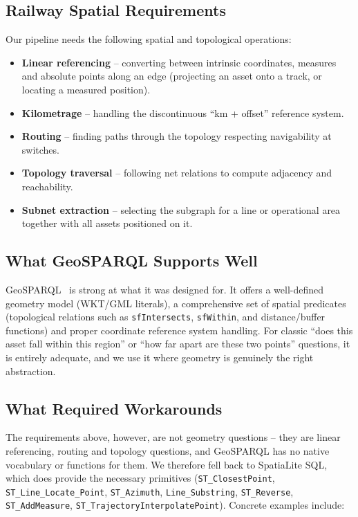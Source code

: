 \documentclass[twocolumn]{ceurart}
\begin{document}
\subsection{Railway Spatial Requirements}

Our pipeline needs the following spatial and topological operations:

\begin{itemize}
  \item \textbf{Linear referencing} -- converting between intrinsic coordinates,
        measures and absolute points along an edge (projecting an asset onto a
        track, or locating a measured position).
  \item \textbf{Kilometrage} -- handling the discontinuous ``km + offset''
        reference system.
  \item \textbf{Routing} -- finding paths through the topology respecting
        navigability at switches.
  \item \textbf{Topology traversal} -- following net relations to compute
        adjacency and reachability.
  \item \textbf{Subnet extraction} -- selecting the subgraph for a line or
        operational area together with all assets positioned on it.
\end{itemize}

\subsection{What GeoSPARQL Supports Well}

GeoSPARQL~\cite{geosparql} is strong at what it was designed for. It offers a
well-defined geometry model (WKT/GML literals), a comprehensive set of spatial
predicates (topological relations such as \texttt{sfIntersects},
\texttt{sfWithin}, and distance/buffer functions) and proper coordinate
reference system handling. For classic ``does this asset fall within this
region'' or ``how far apart are these two points'' questions, it is entirely
adequate, and we use it where geometry is genuinely the right abstraction.

\subsection{What Required Workarounds}

The requirements above, however, are not geometry questions -- they are linear
referencing, routing and topology questions, and GeoSPARQL has no native
vocabulary or functions for them. We therefore fell back to SpatiaLite SQL,
which does provide the necessary primitives (\texttt{ST\_ClosestPoint},
\texttt{ST\_Line\_Locate\_Point}, \texttt{ST\_Azimuth}, \texttt{Line\_Substring},
\texttt{ST\_Reverse}, \texttt{ST\_AddMeasure},
\texttt{ST\_TrajectoryInterpolatePoint}). Concrete examples include:
\end{document}
